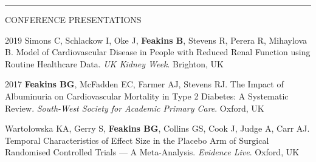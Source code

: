 \documentclass[10pt,a4paper]{article}
\begin{document}
\noindent\rule{\textwidth}{0.4pt}
\begin{cvlist}{CONFERENCE PRESENTATIONS}
	
	\item[2019]
	Simons C, Schlackow I, Oke J, \textbf{Feakins B}, Stevens R, Perera R, Mihaylova B. Model of Cardiovascular Disease in People with Reduced Renal Function using Routine Healthcare Data. \textit{UK Kidney Week}. Brighton, UK
	
	\item[2017]
	\textbf{Feakins BG}, McFadden EC, Farmer AJ, Stevens RJ. The Impact of Albuminuria on Cardiovascular Mortality in Type 2 Diabetes: A Systematic Review. \textit{South-West Society for Academic Primary Care}. Oxford, UK
	
	\item[]
	Warto\l{}owska KA, Gerry S, \textbf{Feakins BG}, Collins GS, Cook J, Judge A, Carr AJ. Temporal Characteristics of Effect Size in the Placebo Arm of Surgical Randomised Controlled Trials --- A Meta-Analysis. \textit{Evidence Live}. Oxford, UK
	
\end{cvlist}
\end{document}
